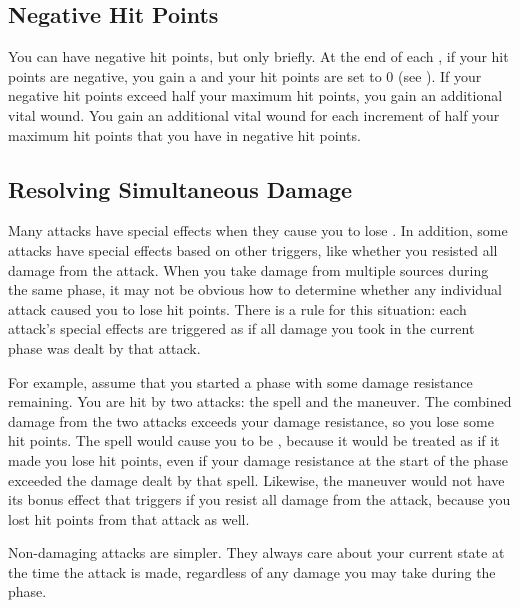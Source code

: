     \subsection{Negative Hit Points}
        You can have negative hit points, but only briefly.
        At the end of each , if your hit points are negative, you gain a  and your hit points are set to 0 (see ).
        If your negative hit points exceed half your maximum hit points, you gain an additional vital wound.
        You gain an additional vital wound for each increment of half your maximum hit points that you have in negative hit points.

    \subsection{Resolving Simultaneous Damage}\label{Resolving Simultaneous Damage}
        Many attacks have special effects when they cause you to lose .
        In addition, some attacks have special effects based on other triggers, like whether you resisted all damage from the attack.
        When you take damage from multiple sources during the same phase, it may not be obvious how to determine whether any individual attack caused you to lose hit points.
        There is a rule for this situation: each attack's special effects are triggered as if all damage you took in the current phase was dealt by that attack.

        For example, assume that you started a phase with some damage resistance remaining.
        You are hit by two attacks: the  spell and the  maneuver.
        The combined damage from the two attacks exceeds your damage resistance, so you lose some hit points.
        The  spell would cause you to be \stunned, because it would be treated as if it made you lose hit points, even if your damage resistance at the start of the phase exceeded the damage dealt by that spell.
        Likewise, the  maneuver would not have its bonus effect that triggers if you resist all damage from the attack, because you lost hit points from that attack as well.

        Non-damaging attacks are simpler.
        They always care about your current state at the time the attack is made, regardless of any damage you may take during the phase.

